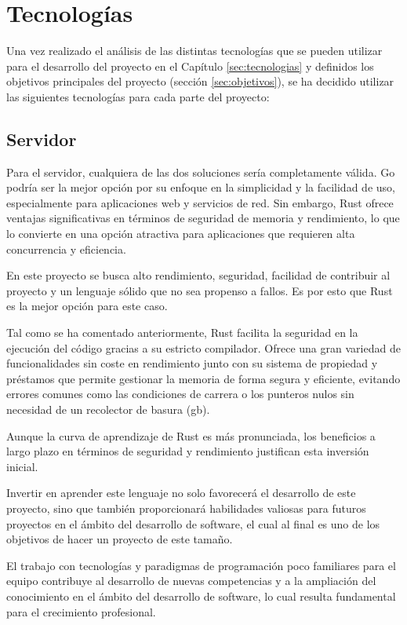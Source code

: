 \section{Tecnologías}
Una vez realizado el análisis de las distintas tecnologías que se pueden utilizar para el desarrollo del proyecto en el Capítulo \ref{sec:tecnologias} y definidos los objetivos principales del proyecto (sección \ref{sec:objetivos}), se ha decidido utilizar las siguientes tecnologías para cada parte del proyecto:

\subsection{Servidor}
Para el servidor, cualquiera de las dos soluciones sería completamente válida. Go podría ser la mejor opción por su enfoque en la simplicidad y la facilidad de uso, especialmente para aplicaciones web y servicios de red. Sin embargo, Rust ofrece ventajas significativas en términos de seguridad de memoria y rendimiento, lo que lo convierte en una opción atractiva para aplicaciones que requieren alta concurrencia y eficiencia.

En este proyecto se busca alto rendimiento, seguridad, facilidad de contribuir al proyecto y un lenguaje sólido que no sea propenso a fallos.
Es por esto que Rust es la mejor opción para este caso. \parencite{rust-for-safety-and-performance}

Tal como se ha comentado anteriormente, Rust facilita la seguridad en la ejecución del código gracias a su estricto compilador.
Ofrece una gran variedad de funcionalidades sin coste en rendimiento junto con su sistema de propiedad y préstamos que permite gestionar la memoria de forma segura y eficiente, evitando errores comunes como las condiciones de carrera o los punteros nulos sin necesidad de un recolector de basura (\acrfull{gb}).

Aunque la curva de aprendizaje de Rust es más pronunciada, los beneficios a largo plazo en términos de seguridad y rendimiento justifican esta inversión inicial.

Invertir en aprender este lenguaje no solo favorecerá el desarrollo de este proyecto, sino que también proporcionará habilidades valiosas para futuros proyectos en el ámbito del desarrollo de software, el cual al final es uno de los objetivos de hacer un proyecto de este tamaño.

El trabajo con tecnologías y paradigmas de programación poco familiares para el equipo contribuye al desarrollo de nuevas competencias y a la ampliación del conocimiento en el ámbito del desarrollo de software, lo cual resulta fundamental para el crecimiento profesional.


